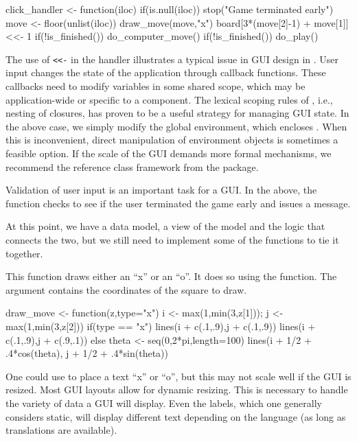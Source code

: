 \begin{Schunk}
\begin{Sinput}
 click_handler <- function(iloc) {
   if(is.null(iloc)) 
     stop("Game terminated early")
   move <- floor(unlist(iloc))
   draw_move(move,"x")
   board[3*(move[2]-1) + move[1]] <<- 1
   if(!is_finished()) 
     do_computer_move()
   if(!is_finished()) 
     do_play()
 }
\end{Sinput}
\end{Schunk}

The use of \verb+<<-+ in the handler illustrates a typical issue in
GUI design in \R.  User input changes the state of the application
through callback functions. These callbacks need to modify variables
in some shared scope, which may be
application-wide or specific to a component. The lexical scoping rules
of \R, i.e., nesting of closures, has proven to be a useful strategy
for managing GUI state. In the above case, we simply modify the global
environment, which encloses . When this is
inconvenient, direct manipulation of environment objects is sometimes
a feasible option. If the scale of the GUI demands more formal
mechanisms, we recommend the reference class framework from the
 package.

Validation of user input is an important task for a GUI. In the above,
the  function checks to see if the user
terminated the game early and issues a message.

At this point, we have a data model, a view of the model and the
logic that connects the two, but we still need to implement some of the
functions to tie it together.


This function draws either an ``x'' or an ``o''. It does so using the
 function. The  argument contains the
coordinates of the square to draw.
\begin{Schunk}
\begin{Sinput}
 draw_move <- function(z,type="x") {
   i <- max(1,min(3,z[1])); j <- max(1,min(3,z[2]))
   if(type == "x") {
     lines(i + c(.1,.9),j + c(.1,.9))
     lines(i + c(.1,.9),j + c(.9,.1))
   } else {
     theta <- seq(0,2*pi,length=100)
     lines(i + 1/2 + .4*cos(theta), j + 1/2 + .4*sin(theta))
   }
 }
\end{Sinput}
\end{Schunk}

One could use  to place a text ``x'' or ``o'', but this may
not scale well if the GUI is resized. Most GUI layouts allow for
dynamic resizing. This is necessary to handle the variety of data a
GUI will display. Even the labels, which one generally considers
static, will display different text depending on the language (as long
as translations are available).

